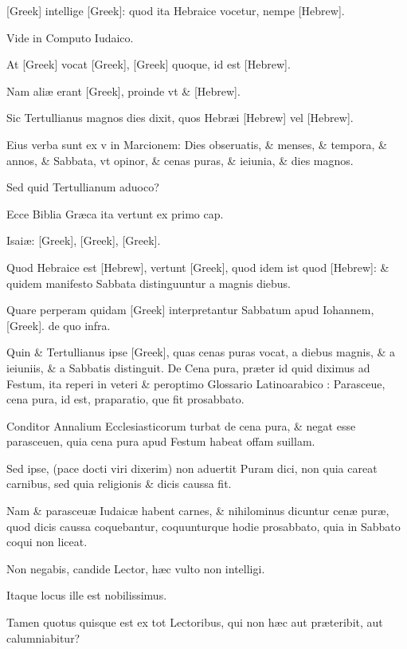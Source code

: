\begin{parnumbers}
\textgreek{[Greek]} intellige \textgreek{[Greek]}: quod ita Hebraice vocetur, nempe \texthebrew{[Hebrew]}.

Vide in Computo Iudaico.

At \textgreek{[Greek]} vocat \textgreek{[Greek], [Greek]} quoque, id est \texthebrew{[Hebrew]}.

Nam aliæ erant \textgreek{[Greek]}, proinde vt \& \texthebrew{[Hebrew]}.

Sic Tertullianus magnos dies dixit, quos Hebræi \texthebrew{[Hebrew]} vel \texthebrew{[Hebrew]}.

Eius verba sunt ex v in Marcionem: Dies obseruatis, \& menses, \& tempora, \& annos, \& Sabbata, vt opinor, \& cenas puras, \& ieiunia, \& dies magnos. 

Sed quid Tertullianum aduoco?

Ecce Biblia Græca ita vertunt ex primo cap.

Isaiæ: \textgreek{[Greek], [Greek], [Greek]}.

Quod Hebraice est \texthebrew{[Hebrew]}, vertunt \textgreek{[Greek]}, quod idem ist quod \texthebrew{[Hebrew]}: \& quidem manifesto Sabbata distinguuntur a magnis diebus. 

Quare perperam quidam \textgreek{[Greek]} interpretantur Sabbatum apud Iohannem, \textgreek{[Greek]}. de quo infra.

Quin \& Tertullianus ipse \textgreek{[Greek]}, quas cenas puras vocat, a diebus magnis, \& a ieiuniis, \& a Sabbatis distinguit. De Cena pura, præter id quid diximus ad Festum, ita reperi in veteri \& peroptimo Glossario Latinoarabico : Parasceue, cena pura, id est, praparatio, que fit prosabbato.

Conditor Annalium Ecclesiasticorum turbat de cena pura, \& negat esse parasceuen, quia cena pura apud Festum habeat offam suillam.

Sed ipse, (pace docti viri dixerim) non aduertit Puram dici, non quia careat carnibus, sed quia religionis \& dicis caussa fit.

Nam \& parasceuæ Iudaicæ habent carnes, \& nihilominus dicuntur cenæ puræ, quod dicis caussa coquebantur, coquunturque hodie prosabbato, quia in Sabbato coqui non liceat.

Non negabis, candide Lector, hæc vulto non intelligi.

Itaque locus ille est nobilissimus. 

Tamen quotus quisque est ex tot Lectoribus, qui non hæc aut præteribit, aut calumniabitur?


\end{parnumbers}
